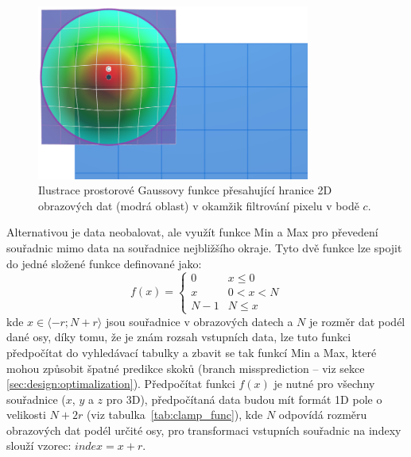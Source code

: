 \begin{figure} [H]
    \centering
    \label{fig:bf:gauss_out_of_image_bounds}
    \includegraphics[width=0.80\textwidth]{figures/bf-gauss-out-of-bounds.png}
    \caption{Ilustrace prostorové Gaussovy funkce přesahující hranice 2D obrazových dat (modrá oblast) v okamžik filtrování pixelu v bodě $c$.}
\end{figure}

Alternativou je data neobalovat, ale využít funkce Min a Max pro převedení souřadnic mimo data na souřadnice nejbližšího okraje. Tyto dvě funkce lze spojit do jedné složené funkce definované jako:
\begin{equation*}
    f(x) =
        \begin{cases} 
            0 & x\leq 0 \\
            x & 0<x<N \\
            N-1 & N\leq x 
       \end{cases}
\end{equation*}
kde $x\in\langle-r;N+r\rangle$ jsou souřadnice v obrazových datech a $N$ je rozměr dat podél dané osy, díky tomu, že je znám rozsah vstupních data, lze tuto funkci předpočítat do vyhledávací tabulky a zbavit se tak funkcí Min a Max, které mohou způsobit špatné predikce skoků (branch missprediction -- viz sekce \ref{sec:design:optimalization}). Předpočítat funkci $f(x)$ je nutné pro všechny souřadnice ($x$, $y$ a $z$ pro 3D), předpočítaná data budou mít formát 1D pole o velikosti $N + 2r$ (viz tabulka~\ref{tab:clamp_func}), kde $N$ odpovídá rozměru obrazových dat podél určité osy, pro transformaci vstupních souřadnic na indexy slouží vzorec: $index = x + r$. 

